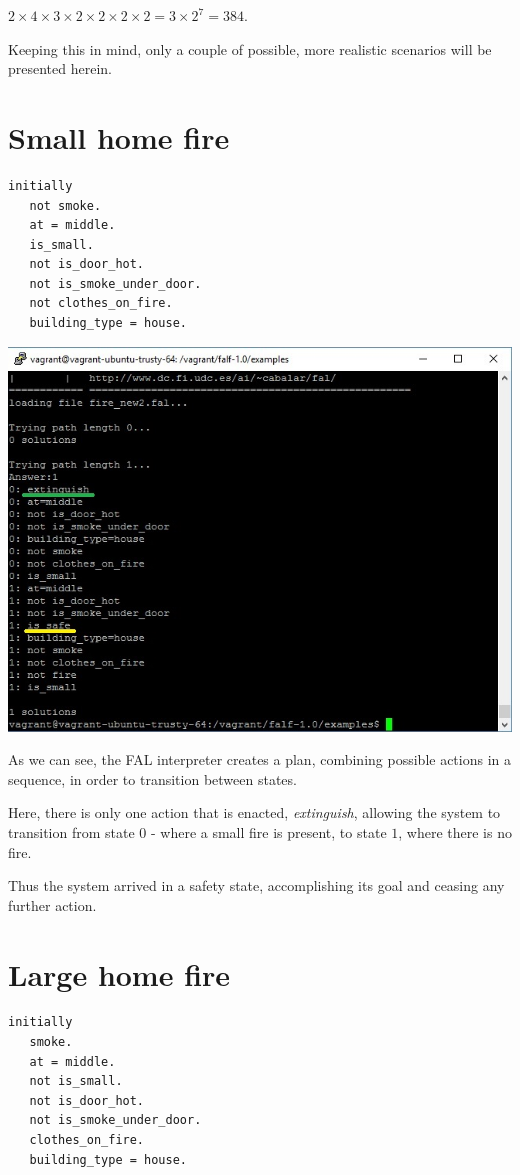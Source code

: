 \documentclass[a4paper,12pt]{report}
\begin{document}
$ 2 \times 4 \times 3 \times 2 \times 2 \times 2 \times 2 = 3 \times 2^7 = 384$.

Keeping this in mind, only a couple of possible, more realistic scenarios will be presented herein.

\section{Small home fire}

\begin{verbatim}
initially
   not smoke.
   at = middle.
   is_small.
   not is_door_hot.
   not is_smoke_under_door.
   not clothes_on_fire.
   building_type = house.
\end{verbatim}


\includegraphics[scale=0.8]{Screenshot_small_home_fire.jpg}


As we can see, the FAL interpreter creates a plan, combining possible actions in a sequence, in order to transition between states.

Here, there is only one action that is enacted, {\it extinguish}, allowing the system to transition from state $0$ - where a small fire is present, to state $1$, where there is no fire.

Thus the system arrived in a safety state, accomplishing its goal and ceasing any further action.

\section{Large home fire}
\begin{verbatim}
initially
   smoke.
   at = middle.
   not is_small.
   not is_door_hot.
   not is_smoke_under_door.
   clothes_on_fire.
   building_type = house.
\end{verbatim}
\end{document}
